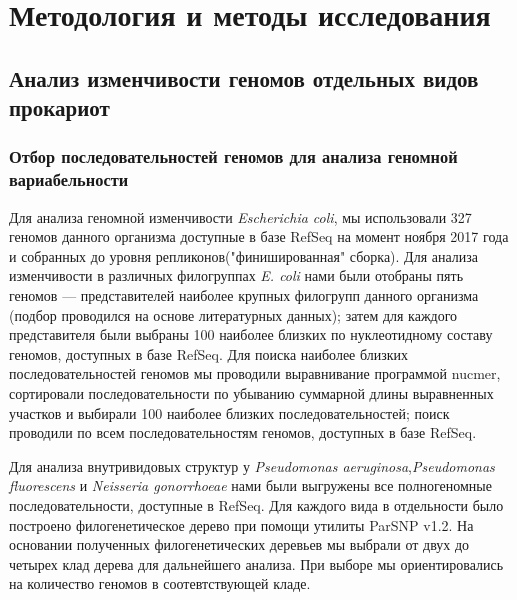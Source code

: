 




\section*{Методология и методы исследования}

\subsection*{Анализ изменчивости геномов отдельных видов прокариот}
\subsubsection*{Отбор последовательностей геномов для анализа геномной вариабельности}
Для анализа геномной изменчивости \textit{Escherichia coli}, мы использовали 327 геномов данного организма доступные в базе RefSeq на момент ноября 2017 года и собранных до уровня репликонов("финишированная" сборка). Для анализа изменчивости в различных филогруппах \textit{E. coli} нами были отобраны пять геномов --- представителей наиболее крупных филогрупп данного организма (подбор проводился на основе литературных данных); затем для каждого представителя были выбраны 100 наиболее близких по нуклеотидному составу геномов, доступных в базе RefSeq. Для поиска наиболее близких последовательностей геномов мы проводили выравнивание программой nucmer, сортировали последовательности по убыванию суммарной длины выравненных участков и выбирали 100 наиболее близких последовательностей; поиск проводили по всем последовательностям геномов, доступных в базе RefSeq. 

Для анализа внутривидовых структур у \textit{Pseudomonas aeruginosa},\textit{Pseudomonas fluorescens} и \textit{Neisseria gonorrhoeae} нами были выгружены все полногеномные последовательности, доступные в RefSeq. Для каждого вида в отдельности было построено филогенетическое дерево при помощи утилиты ParSNP v1.2. На основании полученных филогенетических деревьев мы выбрали от двух до четырех клад дерева для дальнейшего анализа. При выборе мы ориентировались на количество геномов в соотевтствующей кладе. 

